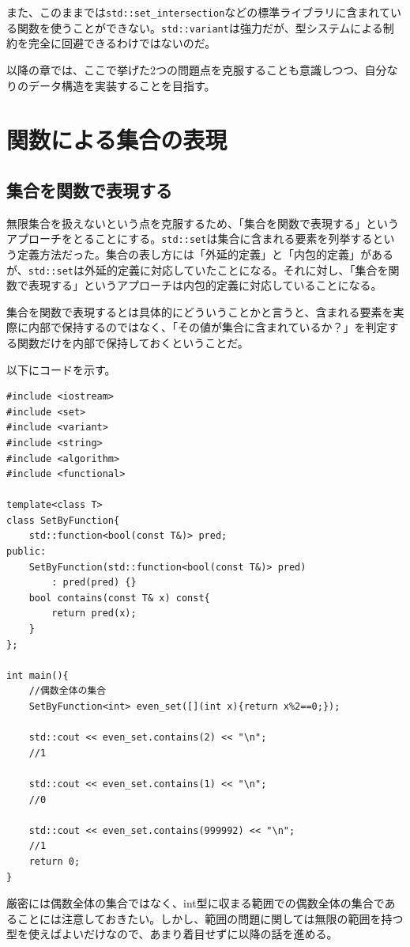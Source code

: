 \documentclass[a4paper,11pt]{ltjsarticle}
\begin{document}
また、このままでは\texttt{std::set\_intersection}などの標準ライブラリに含まれている関数を使うことができない。\texttt{std::variant}は強力だが、型システムによる制約を完全に回避できるわけではないのだ。

以降の章では、ここで挙げた2つの問題点を克服することも意識しつつ、自分なりのデータ構造を実装することを目指す。
\section{関数による集合の表現}
\subsection{集合を関数で表現する}
無限集合を扱えないという点を克服するため、「集合を関数で表現する」というアプローチをとることにする。\texttt{std::set}は集合に含まれる要素を列挙するという定義方法だった。集合の表し方には「外延的定義」と「内包的定義」があるが、\texttt{std::set}は外延的定義に対応していたことになる。それに対し、「集合を関数で表現する」というアプローチは内包的定義に対応していることになる。

集合を関数で表現するとは具体的にどういうことかと言うと、含まれる要素を実際に内部で保持するのではなく、「その値が集合に含まれているか？」を判定する関数だけを内部で保持しておくということだ。

以下にコードを示す。
\begin{lstlisting}
#include <iostream>
#include <set>
#include <variant>
#include <string>
#include <algorithm>
#include <functional>

template<class T>
class SetByFunction{
    std::function<bool(const T&)> pred;
public:
    SetByFunction(std::function<bool(const T&)> pred)
        : pred(pred) {}
    bool contains(const T& x) const{
        return pred(x);
    }
};

int main(){
    //偶数全体の集合
    SetByFunction<int> even_set([](int x){return x%2==0;});
    
    std::cout << even_set.contains(2) << "\n";
    //1
    
    std::cout << even_set.contains(1) << "\n";
    //0

    std::cout << even_set.contains(999992) << "\n";
    //1
    return 0;
}
\end{lstlisting}
厳密には偶数全体の集合ではなく、int型に収まる範囲での偶数全体の集合であることには注意しておきたい。しかし、範囲の問題に関しては無限の範囲を持つ型を使えばよいだけなので、あまり着目せずに以降の話を進める。
\end{document}
